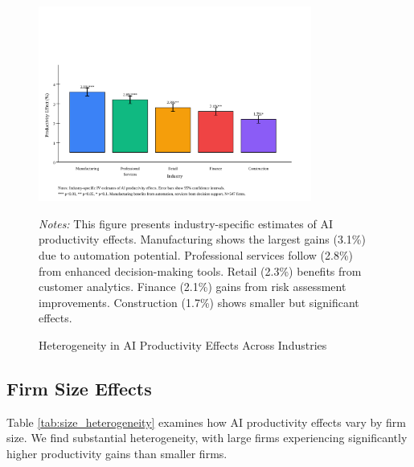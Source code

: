 \documentclass[12pt]{article}
\begin{document}
\begin{figure}[H]
\centering
\includegraphics[width=0.8\textwidth]{figures/figure4_industry_heterogeneity.svg}
\caption{Heterogeneity in AI Productivity Effects Across Industries}
\label{fig:industry_heterogeneity}
\begin{minipage}{\textwidth}
\footnotesize
\textit{Notes:} This figure presents industry-specific estimates of AI productivity effects. Manufacturing shows the largest gains (3.1\%) due to automation potential. Professional services follow (2.8\%) from enhanced decision-making tools. Retail (2.3\%) benefits from customer analytics. Finance (2.1\%) gains from risk assessment improvements. Construction (1.7\%) shows smaller but significant effects.
\end{minipage}
\end{figure}

\subsection{Firm Size Effects}

Table \ref{tab:size_heterogeneity} examines how AI productivity effects vary by firm size. We find substantial heterogeneity, with large firms experiencing significantly higher productivity gains than smaller firms.
\end{document}
